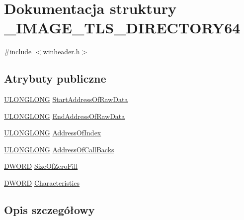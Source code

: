 \hypertarget{struct___i_m_a_g_e___t_l_s___d_i_r_e_c_t_o_r_y64}{\section{Dokumentacja struktury \-\_\-\-I\-M\-A\-G\-E\-\_\-\-T\-L\-S\-\_\-\-D\-I\-R\-E\-C\-T\-O\-R\-Y64}
\label{struct___i_m_a_g_e___t_l_s___d_i_r_e_c_t_o_r_y64}
}


{\ttfamily \#include $<$winheader.\-h$>$}

\subsection*{Atrybuty publiczne}
\begin{DoxyCompactItemize}
\item 
\hyperlink{winheader_8h_ae854efed5cfd3aad7d516ab4e2ce5748}{U\-L\-O\-N\-G\-L\-O\-N\-G} \hyperlink{struct___i_m_a_g_e___t_l_s___d_i_r_e_c_t_o_r_y64_a7ee64440f81908fc6aacc04547651c9a}{Start\-Address\-Of\-Raw\-Data}
\item 
\hyperlink{winheader_8h_ae854efed5cfd3aad7d516ab4e2ce5748}{U\-L\-O\-N\-G\-L\-O\-N\-G} \hyperlink{struct___i_m_a_g_e___t_l_s___d_i_r_e_c_t_o_r_y64_ab61fb7c9f49cd50d98edb94ab1aeea4f}{End\-Address\-Of\-Raw\-Data}
\item 
\hyperlink{winheader_8h_ae854efed5cfd3aad7d516ab4e2ce5748}{U\-L\-O\-N\-G\-L\-O\-N\-G} \hyperlink{struct___i_m_a_g_e___t_l_s___d_i_r_e_c_t_o_r_y64_aeb338678cb68dc21f9cecf8852c8612c}{Address\-Of\-Index}
\item 
\hyperlink{winheader_8h_ae854efed5cfd3aad7d516ab4e2ce5748}{U\-L\-O\-N\-G\-L\-O\-N\-G} \hyperlink{struct___i_m_a_g_e___t_l_s___d_i_r_e_c_t_o_r_y64_a452bbe7cedad14cf65c398c431b1eaab}{Address\-Of\-Call\-Backs}
\item 
\hyperlink{winheader_8h_af483253b2143078cede883fc3c111ad2}{D\-W\-O\-R\-D} \hyperlink{struct___i_m_a_g_e___t_l_s___d_i_r_e_c_t_o_r_y64_a559c7786966fb5feb444c670e75a273a}{Size\-Of\-Zero\-Fill}
\item 
\hyperlink{winheader_8h_af483253b2143078cede883fc3c111ad2}{D\-W\-O\-R\-D} \hyperlink{struct___i_m_a_g_e___t_l_s___d_i_r_e_c_t_o_r_y64_a0679b478596e1c465f5110c8b610de23}{Characteristics}
\end{DoxyCompactItemize}


\subsection{Opis szczegółowy}


